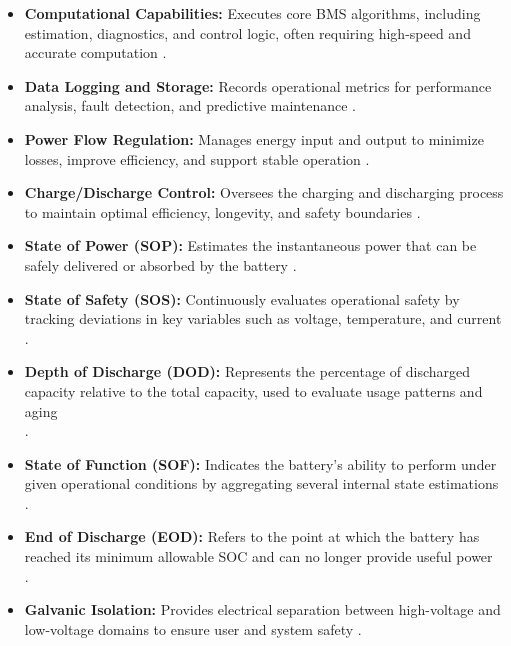 \begin{itemize}
    \item \textbf{Computational Capabilities:} Executes core BMS algorithms, including estimation, diagnostics, and control logic, often requiring high-speed and accurate computation \cite{wevj-12-00120-v2}.

    \item \textbf{Data Logging and Storage:} Records operational metrics for performance analysis, fault detection, and predictive maintenance \cite{wevj-12-00120-v2}.

    \item \textbf{Power Flow Regulation:} Manages energy input and output to minimize losses, improve efficiency, and support stable operation \cite{wevj-12-00120-v2}.

    \item \textbf{Charge/Discharge Control:} Oversees the charging and discharging process to maintain optimal efficiency, longevity, and safety boundaries \cite{wevj-12-00120-v2}.

    \item \textbf{State of Power (SOP):} Estimates the instantaneous power that can be safely delivered or absorbed by the battery \cite{wevj-12-00120-v2}.

    \item \textbf{State of Safety (SOS):} Continuously evaluates operational safety by tracking deviations in key variables such as voltage, temperature, and current\\ \cite{wevj-12-00120-v2}.

    \item \textbf{Depth of Discharge (DOD):} Represents the percentage of discharged capacity relative to the total capacity, used to evaluate usage patterns and aging\\ \cite{wevj-12-00120-v2}.

    \item \textbf{State of Function (SOF):} Indicates the battery’s ability to perform under given operational conditions by aggregating several internal state estimations\\ \cite{wevj-12-00120-v2}.

    \item \textbf{End of Discharge (EOD):} Refers to the point at which the battery has reached its minimum allowable SOC and can no longer provide useful power\\ \cite{wevj-12-00120-v2}.

    \item \textbf{Galvanic Isolation:} Provides electrical separation between high-voltage and low-voltage domains to ensure user and system safety \cite{wevj-12-00120-v2}.
\end{itemize}


